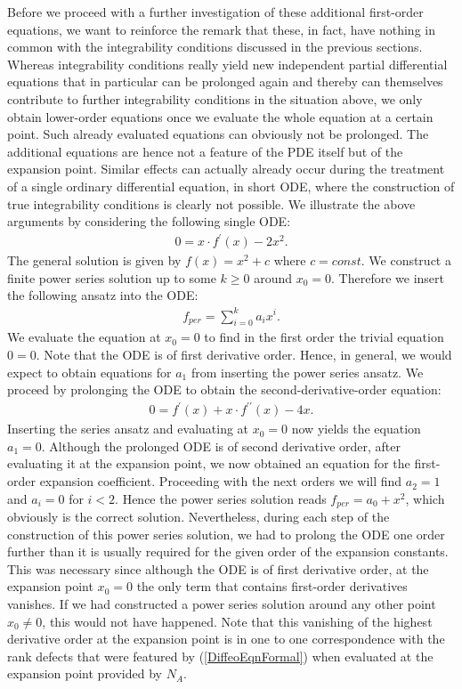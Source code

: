 Before we proceed with a further investigation of these additional first-order equations, we want to reinforce the remark that these, in fact, have nothing in common with the integrability conditions discussed in the previous sections. Whereas integrability conditions really yield new independent partial differential equations that in particular can be prolonged again and thereby can themselves contribute to further integrability conditions in the situation above, we only obtain lower-order equations once we evaluate the whole equation at a certain point. Such already evaluated equations can obviously not be prolonged. The additional equations are hence not a feature of the PDE itself but of the expansion point. Similar effects can actually already occur during the treatment of a single ordinary differential equation, in short ODE, where the construction of true integrability conditions is clearly not possible. We illustrate the above arguments by considering the following single ODE:
\begin{align}
    0 = x \cdot f^{\prime}(x) - 2x^2.
\end{align}
The general solution is given by $f(x) = x^2 +c$ where $c=const$. We construct a finite power series solution up to some $k \geq 0$ around $x_0 = 0$. Therefore we insert the following ansatz into the ODE:
\begin{align}
    f_{per} = \sum_{i=0}^k a_i x^i.
\end{align}
We evaluate the equation at $x_0=0$ to find in the first order the trivial equation $0=0$. Note that the ODE is of first derivative order. Hence, in general, we would expect to obtain equations for $a_1$ from inserting the power series ansatz. We proceed by prolonging the ODE to obtain the second-derivative-order equation:
\begin{align}
    0 = f^{\prime}(x) + x \cdot f^{\prime \prime}(x) - 4 x.
\end{align}
Inserting the series ansatz and evaluating at $x_0=0$ now yields the equation $a_1=0$. Although the prolonged ODE is of second derivative order, after evaluating it at the expansion point, we now obtained an equation for the first-order expansion coefficient. Proceeding with the next orders we will find $a_2 = 1$ and $a_i = 0$ for $i < 2$. Hence the power series solution reads $f_{per} = a_0 + x^2$, which obviously is the correct solution. Nevertheless, during each step of the construction of this power series solution, we had to prolong the ODE one order further than it is usually required for the given order of the expansion constants. This was necessary since although the ODE is of first derivative order, at the expansion point $x_0=0$ the only term that contains first-order derivatives vanishes. If we had constructed a power series solution around any other point $x_0 \neq 0$, this would not have happened. Note that this vanishing of the highest derivative order at the expansion point is in one to one correspondence with the rank defects that were featured by (\ref{DiffeoEqnFormal}) when evaluated at the expansion point provided by $N_A$. 

